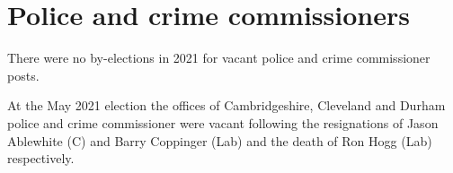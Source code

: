 \documentclass[a4paper,openany]{book}
\begin{document}
%
%

\section{Police and crime commissioners}

There were no by-elections in 2021 for vacant police and crime commissioner posts.

At the May 2021 election the offices of Cambridgeshire, Cleveland and Durham police and crime commissioner were vacant following the resignations of Jason Ablewhite (C) and Barry Coppinger (Lab) and the death of Ron Hogg (Lab) respectively.
\end{document}
